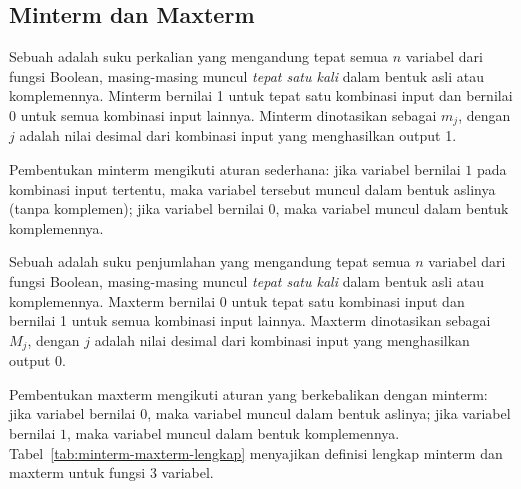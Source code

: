 \subsection{Minterm dan Maxterm}

\begin{definisi}[Minterm]
Sebuah  adalah suku perkalian yang mengandung tepat semua $n$ variabel dari fungsi Boolean, masing-masing muncul \emph{tepat satu kali} dalam bentuk asli atau komplemennya. Minterm bernilai 1 untuk tepat satu kombinasi input dan bernilai 0 untuk semua kombinasi input lainnya. Minterm dinotasikan sebagai $m_j$, dengan $j$ adalah nilai desimal dari kombinasi input yang menghasilkan output 1.
\end{definisi}

Pembentukan minterm mengikuti aturan sederhana: jika variabel bernilai $1$ pada kombinasi input tertentu, maka variabel tersebut muncul dalam bentuk aslinya (tanpa komplemen); jika variabel bernilai $0$, maka variabel muncul dalam bentuk komplemennya.

\begin{definisi}[Maxterm]
Sebuah  adalah suku penjumlahan yang mengandung tepat semua $n$ variabel dari fungsi Boolean, masing-masing muncul \emph{tepat satu kali} dalam bentuk asli atau komplemennya. Maxterm bernilai 0 untuk tepat satu kombinasi input dan bernilai 1 untuk semua kombinasi input lainnya. Maxterm dinotasikan sebagai $M_j$, dengan $j$ adalah nilai desimal dari kombinasi input yang menghasilkan output 0.
\end{definisi}

Pembentukan maxterm mengikuti aturan yang berkebalikan dengan minterm: jika variabel bernilai $0$, maka variabel muncul dalam bentuk aslinya; jika variabel bernilai $1$, maka variabel muncul dalam bentuk komplemennya. Tabel~\ref{tab:minterm-maxterm-lengkap} menyajikan definisi lengkap minterm dan maxterm untuk fungsi 3 variabel.

